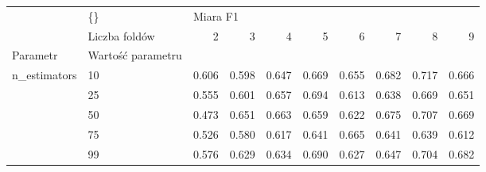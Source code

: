 \begin{tabular}{llrrrrrrrr}
\hline
             & \{\} & \multicolumn{8}{l}{Miara F1} \\
             & Liczba foldów &        2 &      3 &      4 &      5 &      6 &      7 &      8 &      9 \\
Parametr & Wartość parametru &          &        &        &        &        &        &        &        \\
\hline
n\_estimators & 10 &    0.606 &  0.598 &  0.647 &  0.669 &  0.655 &  0.682 &  0.717 &  0.666 \\
             & 25 &    0.555 &  0.601 &  0.657 &  0.694 &  0.613 &  0.638 &  0.669 &  0.651 \\
             & 50 &    0.473 &  0.651 &  0.663 &  0.659 &  0.622 &  0.675 &  0.707 &  0.669 \\
             & 75 &    0.526 &  0.580 &  0.617 &  0.641 &  0.665 &  0.641 &  0.639 &  0.612 \\
             & 99 &    0.576 &  0.629 &  0.634 &  0.690 &  0.627 &  0.647 &  0.704 &  0.682 \\
\hline
\end{tabular}
